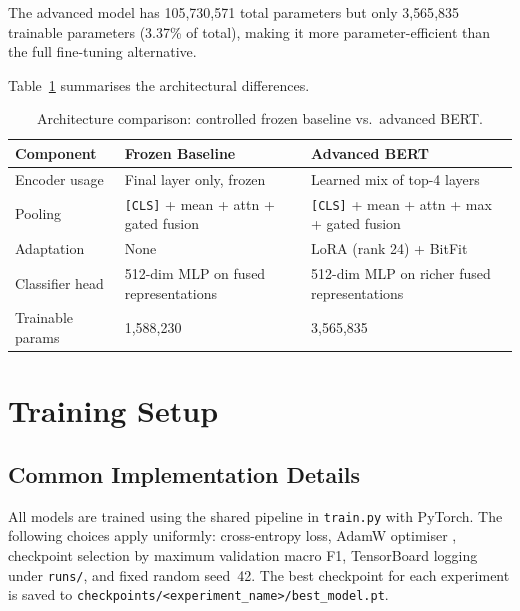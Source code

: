 \documentclass{article}
\begin{document}
The advanced model has 105{,}730{,}571 total parameters but only 3{,}565{,}835
trainable parameters (3.37\% of total), making it more parameter-efficient than
the full fine-tuning alternative.

Table~\ref{tab:arch-compare} summarises the architectural differences.

\begin{table}[h]
  \centering
  \caption{Architecture comparison: controlled frozen baseline vs.\ advanced BERT.}
  \label{tab:arch-compare}
  \setlength{\tabcolsep}{5pt}
  \begin{tabular}{lll}
    \toprule
    Component & Frozen Baseline & Advanced BERT \\
    \midrule
    Encoder usage   & Final layer only, frozen & Learned mix of top-4 layers \\
    Pooling         & \texttt{[CLS]} + mean + attn + gated fusion
                    & \texttt{[CLS]} + mean + attn + max + gated fusion \\
    Adaptation      & None                      & LoRA (rank 24) + BitFit \\
    Classifier head & 512-dim MLP on fused representations & 512-dim MLP on richer fused representations \\
    Trainable params & 1{,}588{,}230           & 3{,}565{,}835 \\
    \bottomrule
  \end{tabular}
\end{table}

\section{Training Setup}

\subsection{Common Implementation Details}

All models are trained using the shared pipeline in \texttt{train.py}
with PyTorch.  The following choices apply uniformly: cross-entropy loss,
AdamW optimiser \citep{loshchilov2018decoupled}, checkpoint selection by
maximum validation macro F1, TensorBoard logging under \texttt{runs/}, and
fixed random seed~42.  The best checkpoint for each experiment is saved to
\texttt{checkpoints/<experiment\_name>/best\_model.pt}.
\end{document}

